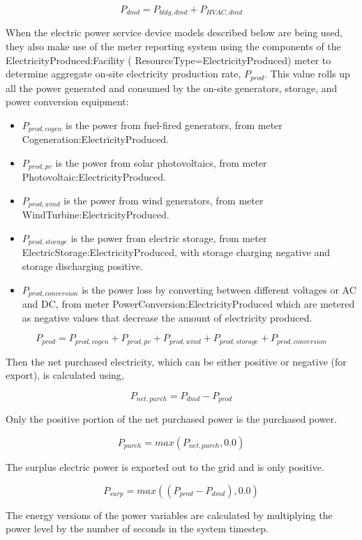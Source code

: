 \begin{equation}
  P_{dmd} = P_{bldg,dmd} + P_{HVAC,dmd}
\end{equation}

When the electric power service device models described below are being used, they also make use of the meter reporting system using the components of the ElectricityProduced:Facility ( ResourceType=ElectricityProduced) meter to determine aggregate on-site electricity production rate, $P_{prod}$.  This value rolls up all the power generated and consumed by the on-site generators, storage, and power conversion equipment:

\begin{itemize}
  \item $P_{prod,cogen}$ is the power from fuel-fired generators, from meter Cogeneration:ElectricityProduced.
  \item $P_{prod,pv}$ is the power from solar photovoltaics, from meter Photovoltaic:ElectricityProduced.
  \item $P_{prod,wind}$ is the power from wind generators, from meter WindTurbine:ElectricityProduced.
  \item $P_{prod,storage}$ is the power from electric storage, from meter ElectricStorage:ElectricityProduced, with storage charging negative and storage discharging positive.
  \item $P_{prod,conversion}$ is the power loss by converting between different voltages or AC and DC, from meter PowerConversion:ElectricityProduced which are metered as negative values that decrease the amount of electricity produced.
\end{itemize}

\begin{equation}
  {P_{prod}}= {P_{prod,cogen}} + {P_{prod,pv}} + {P_{prod,wind}} + {P_{prod,storage}} + {P_{prod,conversion}}
\end{equation}

Then the net purchased electricity, which can be either positive or negative (for export), is calculated using,

\begin{equation}
  {P_{net,purch}} = {P_{dmd}} - {P_{prod}}
\end{equation}

Only the positive portion of the net purchased power is the purchased power.

\begin{equation}
  {P_{purch}} = { max ( {P_{net,purch}}, 0.0 ) }
\end{equation}

The surplus electric power is exported out to the grid and is only positive. 

\begin{equation}
  {P_{surp}} =  { max ( ({P_{prod}} - {P_{dmd}}) , 0.0 ) }
\end{equation}

The energy versions of the power variables are calculated by multiplying the power level by the number of seconds in the system timestep. 
